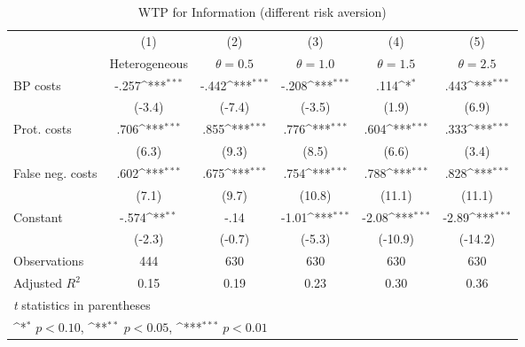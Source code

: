 \begin{table}[htbp]\centering
\def\sym#1{\ifmmode^{#1}\else\(^{#1}\)\fi}
\caption{WTP for Information (different risk aversion)}
\begin{tabular}{l*{5}{c}}
\hline\hline
                &\multicolumn{1}{c}{(1)}&\multicolumn{1}{c}{(2)}&\multicolumn{1}{c}{(3)}&\multicolumn{1}{c}{(4)}&\multicolumn{1}{c}{(5)}\\
                &\multicolumn{1}{c}{Heterogeneous}&\multicolumn{1}{c}{$\theta=0.5$}&\multicolumn{1}{c}{$\theta=1.0$}&\multicolumn{1}{c}{$\theta=1.5$}&\multicolumn{1}{c}{$\theta=2.5$}\\
\hline
BP costs        &    -.257\sym{***}&    -.442\sym{***}&    -.208\sym{***}&     .114\sym{*}  &     .443\sym{***}\\
                &   (-3.4)         &   (-7.4)         &   (-3.5)         &    (1.9)         &    (6.9)         \\
Prot. costs     &     .706\sym{***}&     .855\sym{***}&     .776\sym{***}&     .604\sym{***}&     .333\sym{***}\\
                &    (6.3)         &    (9.3)         &    (8.5)         &    (6.6)         &    (3.4)         \\
False neg. costs&     .602\sym{***}&     .675\sym{***}&     .754\sym{***}&     .788\sym{***}&     .828\sym{***}\\
                &    (7.1)         &    (9.7)         &   (10.8)         &   (11.1)         &   (11.1)         \\
Constant        &    -.574\sym{**} &     -.14         &    -1.01\sym{***}&    -2.08\sym{***}&    -2.89\sym{***}\\
                &   (-2.3)         &   (-0.7)         &   (-5.3)         &  (-10.9)         &  (-14.2)         \\
\hline
Observations    &      444         &      630         &      630         &      630         &      630         \\
Adjusted \(R^{2}\)&     0.15         &     0.19         &     0.23         &     0.30         &     0.36         \\
\hline\hline
\multicolumn{6}{l}{\footnotesize \textit{t} statistics in parentheses}\\
\multicolumn{6}{l}{\footnotesize \sym{*} \(p<0.10\), \sym{**} \(p<0.05\), \sym{***} \(p<0.01\)}\\
\end{tabular}
\end{table}
